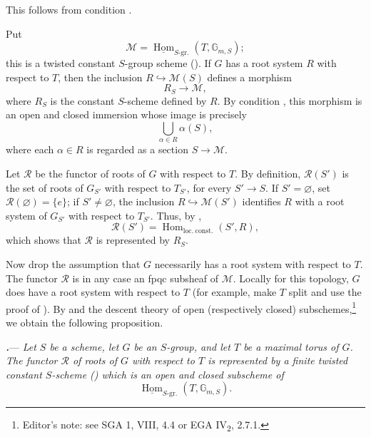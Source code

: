 This follows from condition .

Put
\[
  \mathcal M
  =
  \underline{\operatorname{Hom}}_{S\text{-gr.}}
  (T,\mathbb G_{m,S});
\]
this is a twisted constant \(S\)-group scheme ().  If
\(G\) has a root system \(R\) with respect to \(T\), then the inclusion
\(R\hookrightarrow\mathcal M(S)\) defines a morphism
\[
  R_S\longrightarrow\mathcal M,
\]
where \(R_S\) is the constant \(S\)-scheme defined by \(R\).  By
condition , this morphism is an open and closed immersion whose
image is precisely
\[
  \bigcup_{\alpha\in R}\alpha(S),
\]
where each \(\alpha\in R\) is regarded as a section
\(S\to\mathcal M\).

Let \(\mathcal R\) be the functor of roots of \(G\) with respect to
\(T\).  By definition, \(\mathcal R(S')\) is the set of roots of
\(G_{S'}\) with respect to \(T_{S'}\), for every \(S'\to S\).  If
\(S'=\varnothing\), set \(\mathcal R(\varnothing)=\{e\}\); if
\(S'\ne\varnothing\), the inclusion
\(R\hookrightarrow\mathcal M(S')\) identifies \(R\) with a root
system of \(G_{S'}\) with respect to \(T_{S'}\).  Thus, by ,
\[
  \mathcal R(S')
  =
  \operatorname{Hom}_{\mathrm{loc.\ const.}}(S',R),
\]
which shows that \(\mathcal R\) is represented by \(R_S\).

Now drop the assumption that \(G\) necessarily has a root system with
respect to \(T\).  The functor \(\mathcal R\) is in any case an fpqc
subsheaf of \(\mathcal M\).  Locally for this topology, \(G\) does
have a root system with respect to \(T\) (for example, make \(T\)
split and use the proof of ).  By  and the
descent theory of open (respectively closed)
subschemes,\footnote{Editor's note: see SGA 1, VIII, 4.4 or
EGA IV\textsubscript{2}, 2.7.1.} we obtain the following proposition.


\par\medskip\noindent
{}\textbf{\textit{.}}---
\textit{Let \(S\) be a scheme, let \(G\) be an \(S\)-group, and let
\(T\) be a maximal torus of \(G\).  The functor \(\mathcal R\) of
roots of \(G\) with respect to \(T\) is represented by a finite
twisted constant \(S\)-scheme \textup{()} which is an
open and closed subscheme of}
\[
  \underline{\operatorname{Hom}}_{S\text{-gr.}}
  (T,\mathbb G_{m,S}).
\]

